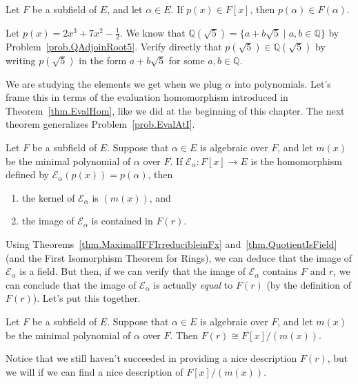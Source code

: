 \begin{theorem}
Let $F$ be a subfield of $E$, and let $\alpha\in E$. If $p(x)\in F[x]$, then $p(\alpha) \in F(\alpha)$.
\end{theorem}

\begin{problem}
Let $p(x) = 2x^3+7x^2-\frac{1}{2}$. We know that $\mathbb{Q}(\sqrt{5}) = \{a+b\sqrt{5}\mid a,b\in \mathbb{Q}\}$ by  Problem~\ref{prob.QAdjoinRoot5}. Verify directly that $p(\sqrt{5}) \in \mathbb{Q}(\sqrt{5})$ by writing $p(\sqrt{5})$ in the form $a+b\sqrt{5}$ for some $a,b\in \mathbb{Q}$.
\end{problem}

We are studying the elements we get when we plug $\alpha$ into polynomials. Let's frame this in terms of the evaluation homomorphism introduced in Theorem~\ref{thm.EvalHom}, like we did at the beginning of this chapter. The next theorem generalizes Problem~\ref{prob.EvalAtI}.

\begin{theorem}
Let $F$ be a subfield of $E$. Suppose that $\alpha\in E$ is algebraic over $F$, and let $m(x)$ be the minimal polynomial of $\alpha$ over $F$. If $\mathcal{E}_\alpha:F[x] \rightarrow E$ is the homomorphism defined by $\mathcal{E}_\alpha(p(x)) = p(\alpha)$, then 
\begin{enumerate}
\item the kernel of $\mathcal{E}_\alpha$ is $(m(x))$, and
\item the image of $\mathcal{E}_\alpha$ is contained in $F(r)$.
\end{enumerate}
\end{theorem}

Using Theorems~\ref{thm.MaximalIFFIrreducibleinFx} and~\ref{thm.QuotientIsField} (and the First Isomorphism Theorem for Rings), we can deduce that the image of $\mathcal{E}_\alpha$ is a field. But then, if we can verify that the image of $\mathcal{E}_\alpha$ contains $F$ and $r$, we can conclude that the image of $\mathcal{E}_\alpha$ is actually \emph{equal} to $F(r)$ (by the definition of $F(r)$). Let's put this together.

\begin{theorem}
Let $F$ be a subfield of $E$. Suppose that $\alpha\in E$ is algebraic over $F$, and let $m(x)$ be the minimal polynomial of $\alpha$ over $F$. Then 
$F(r) \cong F[x]/(m(x)).$
\end{theorem}

Notice that we still haven't succeeded in providing a nice description $F(r)$, but we will if we can find a nice description of $F[x]/(m(x))$.

